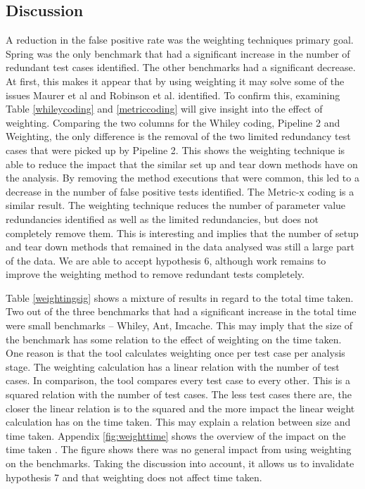 \subsection{Discussion}
A reduction in the false positive rate was the weighting techniques primary goal. Spring was the only benchmark that had a significant increase in the number of redundant test cases identified. The other benchmarks had a significant decrease. At first, this makes it appear that by using weighting it may solve some of the issues Maurer et al  \cite{koochakzadeh2009test} and Robinson et al. \cite{li2008static} identified. To confirm this, examining Table \ref{whileycoding} and \ref{metriccoding} will give insight into the effect of weighting. Comparing the two columns for the Whiley coding, Pipeline 2 and Weighting, the only difference is the removal of the two limited redundancy test cases that were picked up by Pipeline 2. This shows the weighting technique is able to reduce the impact that the similar set up and tear down methods have on the analysis. By removing the method executions that were common, this led to a decrease in the number of false positive tests identified. The Metric-x coding is a similar result. The weighting technique reduces the number of parameter value redundancies identified as well as the limited redundancies, but does not completely remove them. This is interesting and implies that the number of setup and tear down methods that remained in the data analysed was still a large part of the data. We are able to accept hypothesis 6, although work remains to improve the weighting method to remove redundant tests completely.

Table \ref{weightingsig} shows a mixture of results in regard to the total time taken. Two out of the three benchmarks that had a significant increase in the total time were small benchmarks -- Whiley, Ant, Imcache. This may imply that the size of the benchmark has some relation to the effect of weighting on the time taken. One reason is that the tool calculates weighting once per test case per analysis stage. The weighting calculation has a linear relation with the number of test cases. In comparison, the tool compares every test case to every other. This is a squared relation with the number of test cases. The less test cases there are, the closer the linear relation is to the squared and the more impact the linear weight calculation has on the time taken. This may explain a relation between size and time taken. Appendix \ref{fig:weighttime} shows the overview of the impact on the time taken . The figure shows there was no general impact from using weighting on the benchmarks. Taking the discussion into account, it allows us to invalidate hypothesis 7 and that weighting does not affect time taken.

